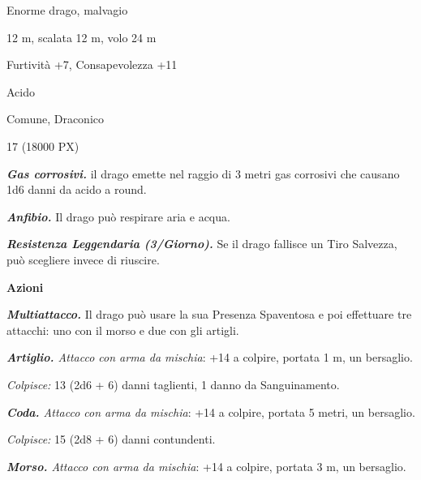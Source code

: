 \begin{multicols}{2}
{
\begin{description}[noitemsep, topsep=0pt, parsep=0pt, partopsep=0pt, itemsep=1pt, leftmargin=2.35cm,  labelwidth=2.2cm, itemindent=0cm, listparindent=0pt] %
\setlength{\baselineskip}{10pt}
\item[\textbf{Taglia/Tipo}] Enorme drago, malvagio
\item[\textbf{Caratt.}] 
\item[\textbf{Punti Ferita}] 
\item[\textbf{Movimento}] 12 m, scalata 12 m, volo 24 m
\item[\textbf{Tiri Salvez.}] 
\item[\textbf{Comp.}] Furtività +7, Consapevolezza +11
\item[\textbf{Imm. Danni}] Acido
\item[\textbf{Sensi}] 
\item[\textbf{Linguaggi}] Comune, Draconico
\item[\textbf{Sfida}] 17 (18000 PX)
\end{description}
\smallskip

\emph{\textbf{Gas corrosivi.}} il drago emette nel raggio di 3 metri gas corrosivi che causano 1d6 danni da acido a round.

\emph{\textbf{Anfibio.}} Il drago può respirare aria e acqua.

\emph{\textbf{Resistenza Leggendaria (3/Giorno).}} Se il drago fallisce un Tiro Salvezza, può scegliere invece di riuscire.

\textbf{Azioni}

\emph{\textbf{Multiattacco.}} Il drago può usare la sua Presenza Spaventosa e poi effettuare tre attacchi: uno con il morso e due con gli artigli.

\emph{\textbf{Artiglio.} Attacco con arma da mischia}: +14 a colpire, portata 1 m, un bersaglio.

\emph{Colpisce:} 13 (2d6 + 6) danni taglienti, 1 danno da Sanguinamento.

\emph{\textbf{Coda.} Attacco con arma da mischia}: +14 a colpire, portata 5 metri, un bersaglio.

\emph{Colpisce:} 15 (2d8 + 6) danni contundenti.

\emph{\textbf{Morso.} Attacco con arma da mischia}: +14 a colpire, portata 3 m, un bersaglio.

}
\end{multicols}
